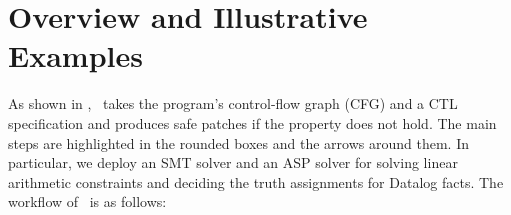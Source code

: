 \vspace{-1.5mm}
\section{Overview and Illustrative Examples}

As shown in ,  
\toolName\ takes the program's control-flow graph (CFG) and a CTL specification and produces safe patches if the property does not hold. 
The main steps are highlighted in the rounded boxes and the arrows around them. 
In particular, we deploy an SMT solver \cite{DBLP:conf/tacas/MouraB08} and an ASP solver \cite{DBLP:books/sp/Lifschitz19} for solving linear arithmetic constraints and deciding the truth assignments 
for Datalog facts. %
The workflow of \toolName\ is as follows: 



